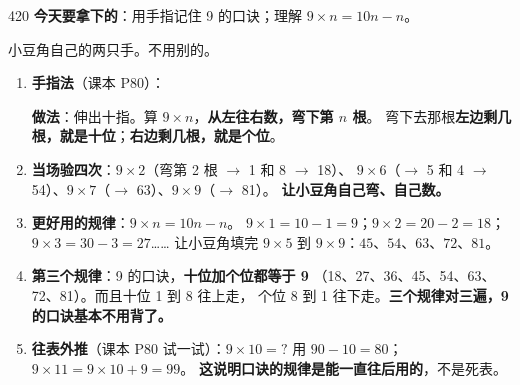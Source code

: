 \begin{lesson}{4}{20}
\textbf{今天要拿下的}：用手指记住 9 的口诀；理解 $9\times n = 10n-n$。

\begin{materials}
小豆角自己的两只手。不用别的。
\end{materials}

\begin{enumerate}
  \item \textbf{手指法}（课本 P80）：
        \begin{center}
        \end{center}
        \textbf{做法}：伸出十指。算 $9\times n$，\textbf{从左往右数，弯下第 $n$ 根}。
        弯下去那根\textbf{左边剩几根，就是十位}；\textbf{右边剩几根，就是个位}。
  \item \textbf{当场验四次}：$9\times2$（弯第 2 根 $\to$ 1 和 8 $\to$ 18）、
        $9\times6$（$\to$ 5 和 4 $\to$ 54）、$9\times7$（$\to$ 63）、$9\times9$（$\to$ 81）。
        \textbf{让小豆角自己弯、自己数。}
  \item \textbf{更好用的规律}：$9\times n = 10n-n$。
        $9\times1=10-1=9$；$9\times2=20-2=18$；$9\times3=30-3=27$……
        让小豆角填完 $9\times5$ 到 $9\times9$：$45$、$54$、$63$、$72$、$81$。
  \item \textbf{第三个规律}：9 的口诀，\textbf{十位加个位都等于 9}
        （18、27、36、45、54、63、72、81）。而且十位 1 到 8 往上走，
        个位 8 到 1 往下走。\textbf{三个规律对三遍，9 的口诀基本不用背了。}
  \item \textbf{往表外推}（课本 P80 试一试）：$9\times10=?$ 用 $90-10=80$；
        $9\times11=9\times10+9=99$。
        \textbf{这说明口诀的规律是能一直往后用的}，不是死表。
\end{enumerate}


\end{lesson}
